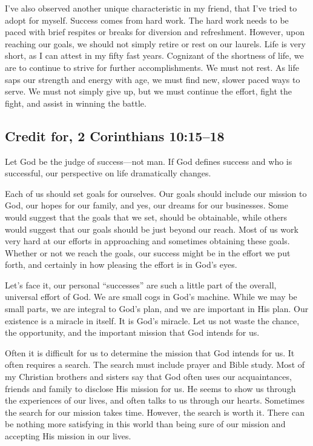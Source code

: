 \documentclass[12pt]{memoir}
\begin{document}
I've also observed another unique characteristic in my friend, that
I've tried to adopt for myself. Success comes from hard work. The
hard work needs to be paced with brief respites or breaks for diversion
and refreshment. However, upon reaching our goals, we should not simply
retire or rest on our laurels. Life is very short, as I can attest
in my fifty fast years. Cognizant of the shortness of life, we are
to continue to strive for further accomplishments. We must not rest.
As life saps our strength and energy with age, we must find new, slower
paced ways to serve. We must not simply give up, but we must continue
the effort, fight the fight, and assist in winning the battle. 

\subsection{Credit for, 2 Corinthians 10:15--18}

Let God be the judge of success---not man. If God defines success
and who is successful, our perspective on life dramatically changes.

Each of us should set goals for ourselves. Our goals should include
our mission to God, our hopes for our family, and yes, our dreams
for our businesses. Some would suggest that the goals that we set,
should be obtainable, while others would suggest that our goals should
be just beyond our reach. Most of us work very hard at our efforts
in approaching and sometimes obtaining these goals. Whether or not
we reach the goals, our success might be in the effort we put forth,
and certainly in how pleasing the effort is in God's eyes.

Let's face it, our personal ``successes'' are such a little part
of the overall, universal effort of God. We are small cogs in God's
machine. While we may be small parts, we are integral to God's plan,
and we are important in His plan. Our existence is a miracle in itself.
It is God's miracle. Let us not waste the chance, the opportunity,
and the important mission that God intends for us.

Often it is difficult for us to determine the mission that God intends
for us. It often requires a search. The search must include prayer
and Bible study. Most of my Christian brothers and sisters say that
God often uses our acquaintances, friends and family to disclose His
mission for us. He seems to show us through the experiences of our
lives, and often talks to us through our hearts. Sometimes the search
for our mission takes time. However, the search is worth it. There
can be nothing more satisfying in this world than being sure of our
mission and accepting His mission in our lives.
\end{document}
